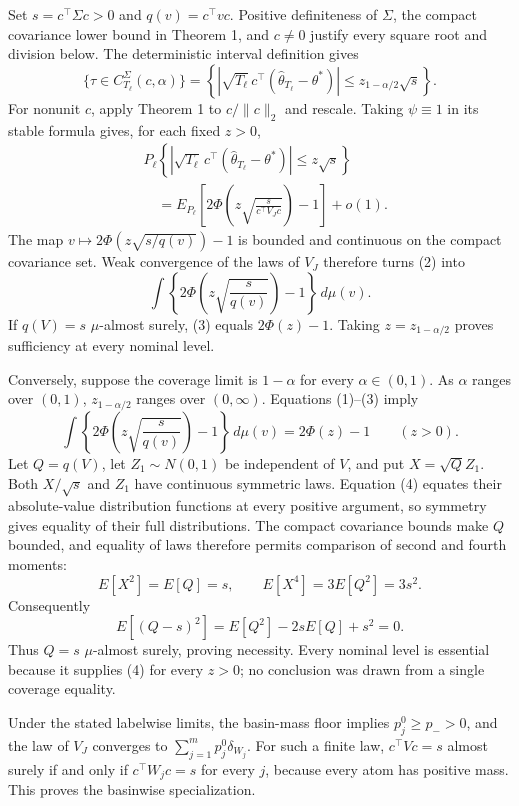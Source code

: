 Set \(s=c^\top\Sigma c>0\) and \(q(v)=c^\top vc\). Positive definiteness of \(\Sigma\), the compact covariance lower bound in Theorem 1, and \(c\ne0\) justify every square root and division below. The deterministic interval definition gives
\[
 \{\tau\in C_{T_\ell}^{\Sigma}(c,\alpha)\}
 =\left\{\left|\sqrt{T_\ell}\,c^\top(\widehat\theta_{T_\ell}-\theta^*)\right|
 \le z_{1-\alpha/2}\sqrt s\right\}. \tag{1}
\]
For nonunit \(c\), apply Theorem 1 to \(c/\|c\|_2\) and rescale. Taking \(\psi\equiv1\) in its stable formula gives, for each fixed \(z>0\),
\[
\begin{aligned}
 &P_\ell\!\left\{\left|\sqrt{T_\ell}\,c^\top
 (\widehat\theta_{T_\ell}-\theta^*)\right|\le z\sqrt s\right\}\\
 &\quad=E_{P_\ell}\!\left[2\Phi\!\left(z\sqrt{\frac{s}{c^\top V_Jc}}\right)-1\right]+o(1).
\end{aligned}\tag{2}
\]
The map \(v\mapsto2\Phi(z\sqrt{s/q(v)})-1\) is bounded and continuous on the compact covariance set. Weak convergence of the laws of \(V_J\) therefore turns (2) into
\[
 \int\left\{2\Phi\!\left(z\sqrt{\frac{s}{q(v)}}\right)-1\right\}\,d\mu(v). \tag{3}
\]
If \(q(V)=s\) \(\mu\)-almost surely, (3) equals \(2\Phi(z)-1\). Taking \(z=z_{1-\alpha/2}\) proves sufficiency at every nominal level.

Conversely, suppose the coverage limit is \(1-\alpha\) for every \(\alpha\in(0,1)\). As \(\alpha\) ranges over \((0,1)\), \(z_{1-\alpha/2}\) ranges over \((0,\infty)\). Equations (1)--(3) imply
\[
 \int\left\{2\Phi\!\left(z\sqrt{\frac{s}{q(v)}}\right)-1\right\}\,d\mu(v)
 =2\Phi(z)-1\qquad(z>0). \tag{4}
\]
Let \(Q=q(V)\), let \(Z_1\sim N(0,1)\) be independent of \(V\), and put \(X=\sqrt QZ_1\). Both \(X/\sqrt s\) and \(Z_1\) have continuous symmetric laws. Equation (4) equates their absolute-value distribution functions at every positive argument, so symmetry gives equality of their full distributions. The compact covariance bounds make \(Q\) bounded, and equality of laws therefore permits comparison of second and fourth moments:
\[
 E[X^2]=E[Q]=s,
 \qquad E[X^4]=3E[Q^2]=3s^2. \tag{5}
\]
Consequently
\[
 E[(Q-s)^2]=E[Q^2]-2sE[Q]+s^2=0. \tag{6}
\]
Thus \(Q=s\) \(\mu\)-almost surely, proving necessity. Every nominal level is essential because it supplies (4) for every \(z>0\); no conclusion was drawn from a single coverage equality.

Under the stated labelwise limits, the basin-mass floor implies \(p_j^0\ge p_->0\), and the law of \(V_J\) converges to \(\sum_{j=1}^mp_j^0\delta_{W_j}\). For such a finite law, \(c^\top Vc=s\) almost surely if and only if \(c^\top W_jc=s\) for every \(j\), because every atom has positive mass. This proves the basinwise specialization.